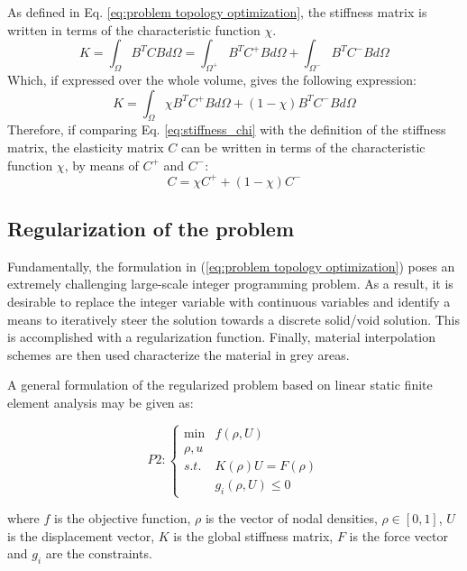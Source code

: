 As defined in Eq. \ref{eq:problem topology optimization}, the stiffness matrix is written in terms of the characteristic function $\chi$.
\begin{equation}
K=\int_{\Omega}^{}B^TCBd\Omega=\int_{\Omega^+}^{}B^TC^+Bd\Omega+\int_{\Omega^-}^{}B^TC^-Bd\Omega
\end{equation}
Which, if expressed over the whole volume, gives the following expression:
\begin{equation}
K=\int_{\Omega}^{}\chi B^TC^+Bd\Omega+(1-\chi)B^TC^-Bd\Omega
\label{eq:stiffness_chi}
\end{equation}
Therefore, if comparing Eq. \ref{eq:stiffness_chi} with the definition of the stiffness matrix, the elasticity matrix $ C $ can be written in terms of the characteristic function $\chi$, by means of $C^+$ and $C^-$:
\begin{equation}
C=\chi C^+ + (1-\chi)C^-
\end{equation}


\subsection{Regularization of the problem}

Fundamentally, the formulation in (\ref{eq:problem topology optimization})
poses an extremely challenging large-scale integer programming problem.
As a result, it is desirable to replace the integer variable with
continuous variables and identify a means to iteratively steer the
solution towards a discrete solid/void solution. This is accomplished
with a regularization function. Finally, material interpolation
schemes are then used characterize the material in grey areas.

A general formulation of the regularized problem based on linear static
finite element analysis may be given as: 

\begin{equation}
P2:\left\{ \begin{array}{cc}
\min & f(\rho,U)\\
\rho, u & \\
s.t. & K(\rho)U=F(\rho)\\
 & g_{i}(\rho,U)\leq0
\end{array}\right.\label{eq:problem topology optimization-1}
\end{equation}

where $f$ is the objective function, $\rho$ is the vector of nodal
densities, $\rho \in \left[0, 1\right]$, $U$ is the displacement vector, $K$ is the global stiffness
matrix, $F$ is the force vector and $g_{i}$ are the constraints.


